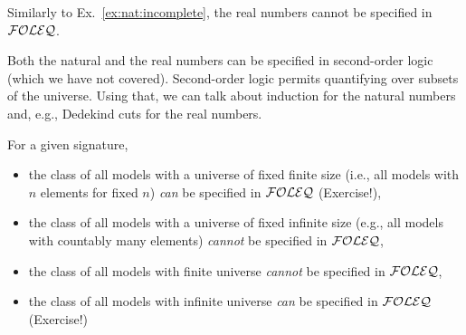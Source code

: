 \begin{example}
Similarly to Ex.~\ref{ex:nat:incomplete}, the real numbers cannot be specified in ${\mathcal{FOLEQ}}$.
\end{example}

\begin{example}
Both the natural and the real numbers can be specified in second-order logic (which we have not covered).
Second-order logic permits quantifying over subsets of the universe. Using that, we can talk about induction for the natural numbers and, e.g., Dedekind cuts for the real numbers.
\end{example}

\begin{example}
For a given signature,
\begin{itemize}
  \item the class of all models with a universe of fixed finite size (i.e., all models with $n$ elements for fixed $n$) \emph{can} be specified in ${\mathcal{FOLEQ}}$ (Exercise!),
	\item the class of all models with a universe of fixed infinite size (e.g., all models with countably many elements) \emph{cannot} be specified in ${\mathcal{FOLEQ}}$,
	\item the class of all models with finite universe \emph{cannot} be specified in ${\mathcal{FOLEQ}}$,
	\item the class of all models with infinite universe \emph{can} be specified in ${\mathcal{FOLEQ}}$ (Exercise!)
\end{itemize}
\end{example}
	